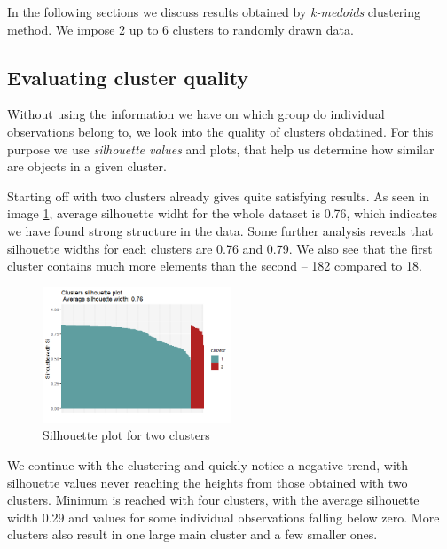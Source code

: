 \documentclass[12pt]{article}
\begin{document}
In the following sections we discuss results obtained by \textit{k-medoids} clustering method. We impose 2 up to 6 clusters to randomly drawn data.

\subsection{Evaluating cluster quality}
Without using the information we have on which group do individual observations belong to, we look into the quality of clusters obdatined. For this purpose we 
use \textit{silhouette values} and plots, that help us determine how similar are objects in a given cluster.

Starting off with two clusters already gives quite satisfying results. As seen in image \ref{fig:silhouette_pam2}, average silhouette widht for the whole dataset is 0.76,
which indicates we have found strong structure in the data.
Some further analysis reveals that silhouette widths for each clusters are 0.76 and 0.79. We also see that the first cluster contains much more elements than
the second -- 182 compared to 18.

\begin{figure}[h]
  \begin{center}
    \includegraphics[width = 0.5\textwidth]{../images/project2/silhouette_pam2.png}
    \caption{Silhouette plot for two clusters}
    \label{fig:silhouette_pam2}
  \end{center}
\end{figure}

We continue with the clustering and quickly notice a negative trend, with silhouette values never reaching the heights from those obtained with two clusters.
Minimum is reached with four clusters, with the average silhouette width 0.29 and values for some individual observations falling below zero. More clusters also
result in one large main cluster and a few smaller ones.
\end{document}
